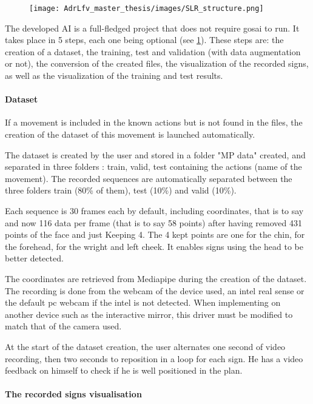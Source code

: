 \begin{figure}[h]
    \centering
    \texttt{[image: AdrLfv\_master\_thesis/images/SLR\_structure.png]}
    \caption{}
    \label{fig:SLR_structure}
\end{figure}

The developed AI is a full-fledged project that does not require gosai to run. It takes place in 5 steps, each one being optional (see \ref{fig:SLR_structure}). These steps are: the creation of a dataset, the training, test and validation (with data augmentation or not), the conversion of the created files, the visualization of the recorded signs, as well as the visualization of the training and test results.

\paragraph{Dataset}

If a movement is included in the known actions but is not found in the files, the creation of the dataset of this movement is launched automatically. 

The dataset is created by the user and stored in a folder "MP data" created, and separated in three
folders : train, valid, test containing the actions (name of the movement). The recorded sequences are automatically separated between the three folders train (80\% of them), test (10\%) and valid (10\%). 

Each sequence is 30 frames each by default, including coordinates, that is to say and now 116 data per frame (that is to say 58 points) after having removed  431 points of the face and just Keeping 4. The 4 kept points are one for the chin, for the forehead, for the wright and left cheek.
It enables signs using the head to be better detected.

The coordinates are retrieved from Mediapipe during the creation of the dataset. The recording is done from the webcam of the device used, an intel real sense or the default pc webcam if the intel is not detected. When implementing on another device such as the interactive mirror, this driver must be modified to match that of the camera used.

At the start of the dataset creation, the user alternates one second of video recording, then two seconds to reposition in a loop for each sign. He has a video feedback on himself to check if he is well positioned in the plan.

\paragraph{The recorded signs visualisation}


